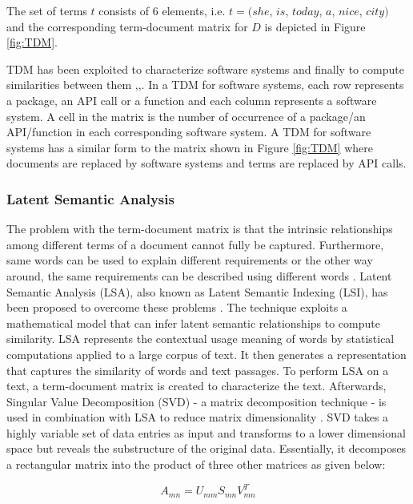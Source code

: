 The set of terms $t$ consists of $6$ elements, i.e. $t=(she$, $is$, $today$, $a$, $nice$, $city)$ and the corresponding term-document matrix for $D$ is depicted in Figure \ref{fig:TDM}.

TDM has been exploited to characterize software systems and finally to compute similarities between them \cite{10.1109/APSEC.2004.69},\cite{10.1109ICPC.2016.7503721},\cite{McMillan:2012:DSS:2337223.2337267}. In a TDM for software systems, each row represents a package, an API call or a function and each column represents a software system. A cell in the matrix is the number of occurrence of a package/an API/function in each corresponding software system. A TDM for software systems has a similar form to the matrix shown in Figure \ref{fig:TDM} where documents are replaced by software systems and terms are replaced by API calls.

\subsubsection{Latent Semantic Analysis}

The problem with the term-document matrix is that the intrinsic relationships among different terms of a document cannot fully be captured. Furthermore, same words can be used to explain different requirements or the other way around, the same requirements can be described using different words \cite{10.1109/APSEC.2004.69}. Latent Semantic Analysis (LSA), also known as Latent Semantic Indexing (LSI), has been proposed to overcome these problems \cite{Landauer1998}. The technique exploits a mathematical model that can infer latent semantic relationships to compute similarity. LSA represents the contextual usage meaning of words by statistical computations applied to a large corpus of text. It then generates a representation that captures the similarity of words and text passages. To perform LSA on a text, a term-document matrix is created to characterize the text. Afterwards, Singular Value Decomposition (SVD) - a matrix decomposition technique - is used in combination with LSA to reduce matrix dimensionality \cite{kb2005}. SVD takes a highly variable set of data entries as input and transforms to a lower dimensional space but reveals the substructure of the original data. Essentially, it decomposes a rectangular matrix into the product of three other matrices as given below\cite{kb2005}:

\begin{equation}
A_{mn}=U_{mm}S_{mn}V_{mn}^{T}
\end{equation}

